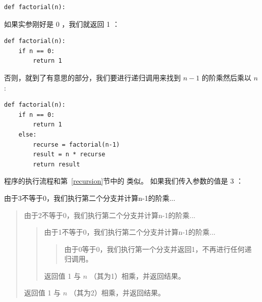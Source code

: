 \begin{lstlisting}
def factorial(n):
\end{lstlisting}

%

如果实参刚好是 0 ，我们就返回 1 ：


\begin{lstlisting}
def factorial(n):
    if n == 0:
        return 1
\end{lstlisting}

%

否则，就到了有意思的部分，我们要进行递归调用来找到 $n-1$ 的阶乘然后乘以 $n$:

\begin{lstlisting}
def factorial(n):
    if n == 0:
        return 1
    else:
        recurse = factorial(n-1)
        result = n * recurse
        return result
\end{lstlisting}

%

程序的执行流程和第~\ref{recursion}节中的  类似。
如果我们传入参数的值是 3 ：


由于3不等于0，我们执行第二个分支并计算n-1的阶乘...

\begin{quote}

由于2不等于0，我们执行第二个分支并计算n-1的阶乘...

  \begin{quote}

  由于1不等于0，我们执行第二个分支并计算n-1的阶乘...

    \begin{quote}

    由于0等于0，我们执行第一个分支并返回1，不再进行任何递归调用。

    \end{quote}



  返回值 1 与 $n$ （其为1）相乘，并返回结果。
  \end{quote}



返回值 1 与 $n$ （其为2）相乘，并返回结果。
\end{quote}


